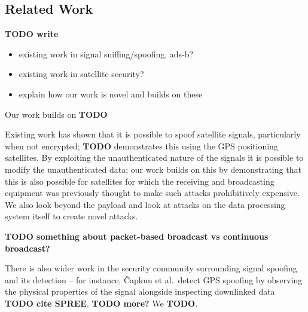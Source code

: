 \subsection{Related Work}

\textbf{TODO write}
\begin{itemize}
    \item existing work in signal sniffing/spoofing, ads-b?
    \item existing work in satellite security?
    \item explain how our work is novel and builds on these
\end{itemize}

Our work builds on \textbf{TODO}

Existing work has shown that it is possible to spoof satellite signals, particularly when not encrypted; \textbf{TODO} demonstrates this using the GPS positioning satellites.
By exploiting the unauthenticated nature of the signals it is possible to modify the unauthenticated data; our work builds on this by demonstrating that this is also possible for satellites for which the receiving and broadcasting equipment was previously thought to make such attacks prohibitively expensive.
We also look beyond the payload and look at attacks on the data processing system itself to create novel attacks.

\textbf{TODO something about packet-based broadcast vs continuous broadcast?}

There is also wider work in the security community surrounding signal spoofing and its detection -- for instance, Čapkun et al.\ detect GPS spoofing by observing the physical properties of the signal alongside inspecting downlinked data \textbf{TODO cite SPREE}.
\textbf{TODO more?}
We \textbf{TODO}.
